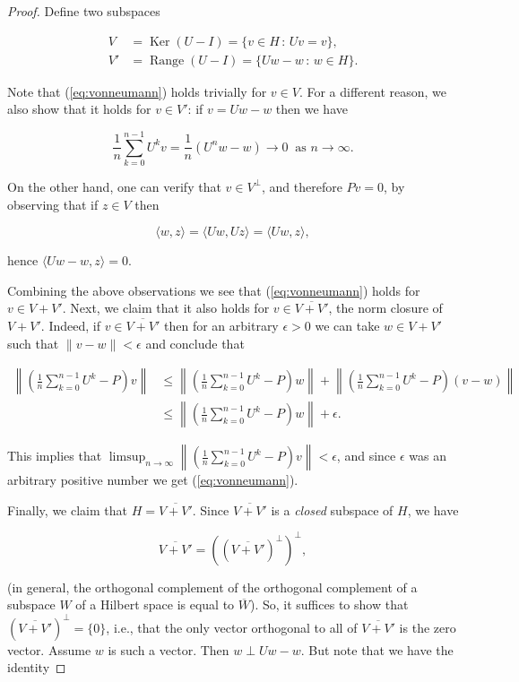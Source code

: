 \documentclass[11pt]{report}
\theoremstyle{plain}
\theoremstyle{definition}
\begin{document}
\begin{proof}
Define two subspaces

\begin{align*}
V&=\operatorname{Ker}(U-I) = \{ v\in H\,:\, Uv=v \}, \\
V'&=\operatorname{Range}(U-I) = \{ Uw-w \,:\, w\in H \}.
\end{align*}

Note that (\ref{eq:vonneumann}) holds trivially for $v\in V$. For a different reason, we also show that it holds for $v\in V'$: if $v=Uw-w$ then we have

\[
\frac{1}{n}\sum_{k=0}^{n-1} U^k v  = \frac{1}{n}\left( U^n w - w \right) \to 0\ \textrm{ as }n\to\infty.
\]

On the other hand, one can verify that $v\in V^\perp$, and therefore $Pv=0$, by observing that if $z\in V$ then

\[
\langle w, z \rangle = \langle Uw,Uz \rangle =
\langle Uw,z\rangle,
\]

hence $\langle Uw-w,z\rangle = 0$.

Combining the above observations we see that (\ref{eq:vonneumann}) holds for $v\in V+V'$. Next, we claim that it also holds for $v\in \overline{V+V'}$, the norm closure of $V+V'$. Indeed, if $v\in \overline{V+V'}$ then for an arbitrary $\epsilon>0$ we can take $w\in V+V'$ such that $\lVert v-w\rVert < \epsilon$ and conclude that

\begin{align*}
\left\lVert \left(\frac{1}{n}\sum_{k=0}^{n-1} U^k-P\right)v \right\rVert
& \le
\left\lVert \left(\frac{1}{n}\sum_{k=0}^{n-1} U^k-P\right)w \right\rVert
+
\left\lVert \left(\frac{1}{n}\sum_{k=0}^{n-1} U^k-P\right)(v-w) \right\rVert \\
& \le
\left\lVert \left(\frac{1}{n}\sum_{k=0}^{n-1} U^k-P\right)w \right\rVert
+  \epsilon.
\end{align*}

This implies that $\limsup_{n\to\infty} \left\lVert \left(\frac{1}{n}\sum_{k=0}^{n-1} U^k-P\right)v \right\rVert < \epsilon$, and since $\epsilon$ was an arbitrary positive number we get (\ref{eq:vonneumann}).

Finally, we claim that $H=\overline{V+V'}$. Since $\overline{V+V'}$ is a \emph{closed} subspace of $H$, we have

\[
\overline{V+V'} = \left( \left(\overline{V+V'}\right)^\perp \right)^\perp,
\]

(in general, the orthogonal complement of the orthogonal complement of a subspace $W$ of a Hilbert space is equal to $\overline{W}$). So, it suffices to show that $\left(\overline{V+V'}\right)^\perp=\{0\}$, i.e., that the only vector orthogonal to all of $\overline{V+V'}$ is the zero vector. Assume $w$ is such a vector. Then $w \perp Uw-w$. But note that we have the identity


\end{proof}
\end{document}
